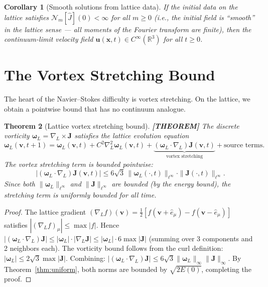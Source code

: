 \documentclass[11pt]{article}
\theoremstyle{tight}
\newtheorem{theorem}{Theorem}[section]
\newtheorem{corollary}[theorem]{Corollary}
\theoremstyle{plainroman}
\newcommand{\R}{\mathbb{R}}
\begin{document}
\begin{corollary}[Smooth solutions from lattice data]\label{cor:smooth}
If the initial data on the lattice satisfies $\mathcal N_m[\hat J](0)<\infty$ for all $m\ge 0$ (i.e., the initial field is ``smooth'' in the lattice sense --- all moments of the Fourier transform are finite), then the continuum-limit velocity field $\mathbf u(\mathbf x,t)\in C^\infty(\R^3)$ for all $t\ge 0$.
\end{corollary}

\section{The Vortex Stretching Bound}

The heart of the Navier--Stokes difficulty is vortex stretching.
On the lattice, we obtain a pointwise bound that has no continuum analogue.

\begin{theorem}[Lattice vortex stretching bound]\label{thm:vortex}
\textbf{[THEOREM]}
The discrete vorticity $\bm\omega_L=\nabla_L\times\mathbf J$ satisfies the lattice evolution equation
\[
\bm\omega_L(\mathbf v,t+1)=\bm\omega_L(\mathbf v,t)+C^2\nabla_L^2\bm\omega_L(\mathbf v,t)+\underbrace{(\bm\omega_L\cdot\nabla_L)\mathbf J(\mathbf v,t)}_{\text{vortex stretching}}+\text{source terms}.
\]
The vortex stretching term is bounded pointwise:
\begin{equation}\label{eq:stretch_bound}
|(\bm\omega_L\cdot\nabla_L)\mathbf J(\mathbf v,t)|\le 6\sqrt{3}\,\|\bm\omega_L(\cdot,t)\|_{\ell^\infty}\cdot\|\mathbf J(\cdot,t)\|_{\ell^\infty}.
\end{equation}
Since both $\|\bm\omega_L\|_{\ell^\infty}$ and $\|\mathbf J\|_{\ell^\infty}$ are bounded (by the energy bound), the stretching term is uniformly bounded for all time.
\end{theorem}
\begin{proof}
The lattice gradient $(\nabla_L f)(\mathbf v)=\frac{1}{2}[f(\mathbf v+\hat e_\mu)-f(\mathbf v-\hat e_\mu)]$ satisfies $|(\nabla_L f)_\mu|\le\max|f|$.
Hence $|(\bm\omega_L\cdot\nabla_L)\mathbf J|\le|\bm\omega_L|\cdot|\nabla_L\mathbf J|\le|\bm\omega_L|\cdot 6\max|\mathbf J|$ (summing over 3 components and 2 neighbors each).
The vorticity bound follows from the curl definition: $|\bm\omega_L|\le 2\sqrt{3}\max|\mathbf J|$.
Combining: $|(\bm\omega_L\cdot\nabla_L)\mathbf J|\le 6\sqrt{3}\|\bm\omega_L\|_\infty\|\mathbf J\|_\infty$.
By Theorem~\ref{thm:uniform}, both norms are bounded by $\sqrt{2E(0)}$, completing the proof.
\end{proof}
\end{document}
